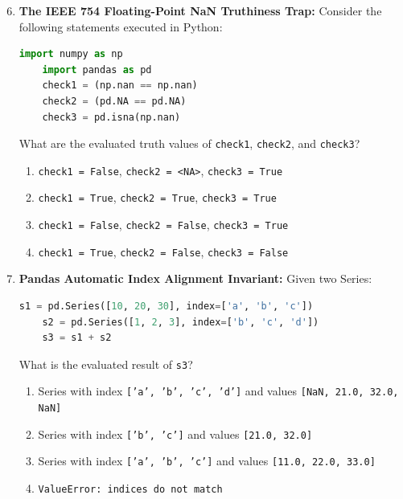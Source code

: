 \begin{enumerate}
    \setcounter{enumi}{5}
    \item \textbf{The IEEE 754 Floating-Point NaN Truthiness Trap:}
    Consider the following statements executed in Python:
    \begin{lstlisting}[language=Python]
    import numpy as np
    import pandas as pd
    check1 = (np.nan == np.nan)
    check2 = (pd.NA == pd.NA)
    check3 = pd.isna(np.nan)
    \end{lstlisting}
    What are the evaluated truth values of \texttt{check1}, \texttt{check2}, and \texttt{check3}?
    \begin{enumerate}
        \item \texttt{check1 = False}, \quad \texttt{check2 = <NA>}, \quad \texttt{check3 = True}
        \item \texttt{check1 = True}, \quad \texttt{check2 = True}, \quad \texttt{check3 = True}
        \item \texttt{check1 = False}, \quad \texttt{check2 = False}, \quad \texttt{check3 = True}
        \item \texttt{check1 = True}, \quad \texttt{check2 = False}, \quad \texttt{check3 = False}
    \end{enumerate}

    \item \textbf{Pandas Automatic Index Alignment Invariant:}
    Given two Series:
    \begin{lstlisting}[language=Python]
    s1 = pd.Series([10, 20, 30], index=['a', 'b', 'c'])
    s2 = pd.Series([1, 2, 3], index=['b', 'c', 'd'])
    s3 = s1 + s2
    \end{lstlisting}
    What is the evaluated result of \texttt{s3}?
    \begin{enumerate}
        \item Series with index \texttt{['a', 'b', 'c', 'd']} and values \texttt{[NaN, 21.0, 32.0, NaN]}
        \item Series with index \texttt{['b', 'c']} and values \texttt{[21.0, 32.0]}
        \item Series with index \texttt{['a', 'b', 'c']} and values \texttt{[11.0, 22.0, 33.0]}
        \item \texttt{ValueError: indices do not match}
    \end{enumerate}
\end{enumerate}
